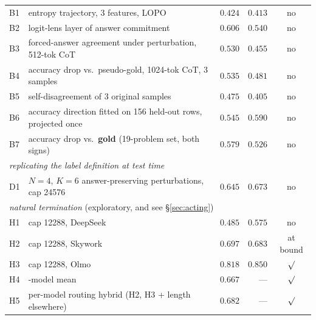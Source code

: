 \documentclass[10pt]{article}
\providecommand{\checkmark}{\ensuremath{\surd}}
\newcommand{\X}{\checkmark}
\begin{document}
\begin{table}[t]
\begin{tabular}{llrrc}
B1 & entropy trajectory, 3 features, LOPO & $0.424$ & $0.413$ & no \\
B2 & logit-lens layer of answer commitment & $0.606$ & $0.540$ & no \\
B3 & forced-answer agreement under perturbation, 512-tok CoT & $0.530$ & $0.455$ & no \\
B4 & accuracy drop vs.\ pseudo-gold, 1024-tok CoT, 3 samples & $0.535$ & $0.481$ & no \\
B5 & self-disagreement of 3 original samples & $0.475$ & $0.405$ & no \\
B6 & accuracy direction fitted on 156 held-out rows, projected once & $0.545$ & $0.590$ & no \\
B7 & accuracy drop vs.\ \textbf{gold} (19-problem set, both signs) & $0.579$ & $0.526$ & no \\
\midrule
\multicolumn{5}{l}{\emph{replicating the label definition at test time}} \\
D1 & $N{=}4$, $K{=}6$ answer-preserving perturbations, cap 24576 & $0.645$ & $0.673$ & no \\
\midrule
\multicolumn{5}{l}{\emph{natural termination} (exploratory, and see \S\ref{sec:acting})} \\
H1 & cap 12288, DeepSeek & $0.485$ & $0.575$ & no \\
H2 & cap 12288, Skywork & $0.697$ & $0.683$ & at bound \\
H3 & cap 12288, Olmo & $\mathbf{0.818}$ & $0.850$ & \X \\
H4 & \;3-model mean & $0.667$ & --- & \X \\
H5 & \;per-model routing hybrid (H2, H3 + length elsewhere) & $\mathbf{0.682}$ & --- & \X \\
\bottomrule
\end{tabular}
\end{table}
\end{document}
